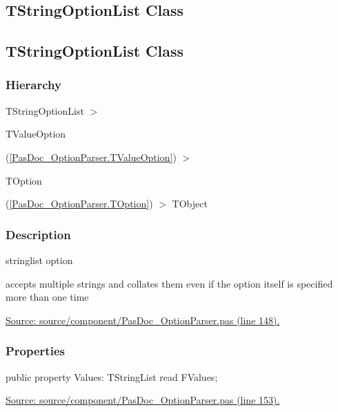 \documentclass{report}
\newif\ifpdf
\begin{document}
\subsection*{\large{\textbf{TStringOptionList Class}}\normalsize\hspace{1ex}\hrulefill}
\else
\subsection*{TStringOptionList Class}
\fi
\label{PasDoc_OptionParser.TStringOptionList}
\subsubsection*{\large{\textbf{Hierarchy}}\normalsize\hspace{1ex}\hfill}
TStringOptionList {$>$} \begin{ttfamily}TValueOption\end{ttfamily}(\ref{PasDoc_OptionParser.TValueOption}) {$>$} \begin{ttfamily}TOption\end{ttfamily}(\ref{PasDoc_OptionParser.TOption}) {$>$} 
TObject
\subsubsection*{\large{\textbf{Description}}\normalsize\hspace{1ex}\hfill}
stringlist option\hfill\vspace*{1ex}

 accepts multiple strings and collates them even if the option itself is specified more than one time\par
\href{https://github.com/pasdoc/pasdoc/blob/master/source/component/PasDoc_OptionParser.pas#L148}{Source: source/component/PasDoc{\_}OptionParser.pas (line 148).}\subsubsection*{\large{\textbf{Properties}}\normalsize\hspace{1ex}\hfill}
\begin{list}{}{
\setlength{\itemindent}{0cm}
\setlength{\listparindent}{0cm}
\setlength{\leftmargin}{\evensidemargin}
\addtolength{\leftmargin}{\tmplength}
\settowidth{\labelsep}{X}
\addtolength{\leftmargin}{\labelsep}
\setlength{\labelwidth}{\tmplength}
}
\label{PasDoc_OptionParser.TStringOptionList-Values}
\item[\textbf{Values}\hfill]
\ifpdf
\begin{flushleft}
\fi
\begin{ttfamily}
public property Values: TStringList read FValues;\end{ttfamily}

\ifpdf
\end{flushleft}
\fi


\par  \par
\href{https://github.com/pasdoc/pasdoc/blob/master/source/component/PasDoc_OptionParser.pas#L153}{Source: source/component/PasDoc{\_}OptionParser.pas (line 153).}\end{list}
\end{document}
